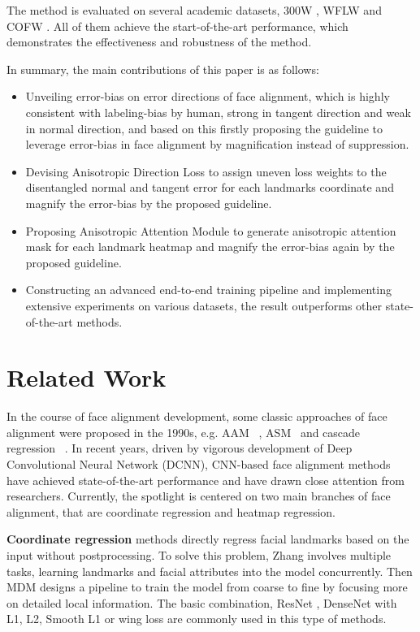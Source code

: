 \documentclass[10pt,twocolumn,letterpaper]{article}
\begin{document}
The method is evaluated on several academic datasets, 300W \cite{sagonas2013300}, WFLW \cite{wu2018look} and COFW \cite{burgos2013robust}. All of them achieve the start-of-the-art performance, which demonstrates the effectiveness and robustness of the method.

In summary, the main contributions of this paper is as follows:
\begin{itemize}
  \item Unveiling error-bias on error directions of face alignment, which is highly consistent with labeling-bias by human, strong in tangent direction and weak in normal direction, and based on this firstly proposing the guideline to leverage error-bias in face alignment by magnification instead of suppression.
  \item Devising Anisotropic Direction Loss to assign uneven loss weights to the disentangled normal and tangent error for each landmarks coordinate and magnify the error-bias by the proposed guideline.
  \item Proposing Anisotropic Attention Module to generate anisotropic attention mask for each landmark heatmap and magnify the error-bias again by the proposed guideline.
  \item Constructing an advanced end-to-end training pipeline and implementing extensive experiments on various datasets, the result outperforms other state-of-the-art methods.
\end{itemize}

\section{Related Work}
\label{section:related_work}

In the course of face alignment development, some classic approaches of face alignment were proposed in the 1990s, e.g. AAM ~\cite{cootes2001active,saragih2007nonlinear,sauer2011accurate,matthews2004active,kahraman2007active}, ASM~ \cite{cootes1992active,cootes1995active,milborrow2008locating} and cascade regression~ \cite{feng2015cascaded,xiong2013supervised}. In recent years, driven by vigorous development of Deep Convolutional Neural Network (DCNN), CNN-based face alignment methods have achieved state-of-the-art performance and have drawn close attention from researchers. Currently, the spotlight is centered on two main branches of face alignment, that are coordinate regression and heatmap regression.

\noindent\textbf{Coordinate regression} methods \cite{sun2013deep,toshev2014deeppose,trigeorgis2016mnemonic,lv2017deep,zhang2014coarse,zhou2013extensive} directly regress facial landmarks based on the input without postprocessing. To solve this problem, Zhang \cite{zhang2015learning} involves multiple tasks, learning landmarks and facial attributes into the model concurrently. Then MDM \cite{trigeorgis2016mnemonic} designs a pipeline to train the model from coarse to fine by focusing more on detailed local information. The basic combination, ResNet \cite{he2016deep}, DenseNet \cite{huang2017densely} with L1, L2, Smooth L1 or wing loss \cite{feng2018wing} are commonly used in this type of methods.
\end{document}
